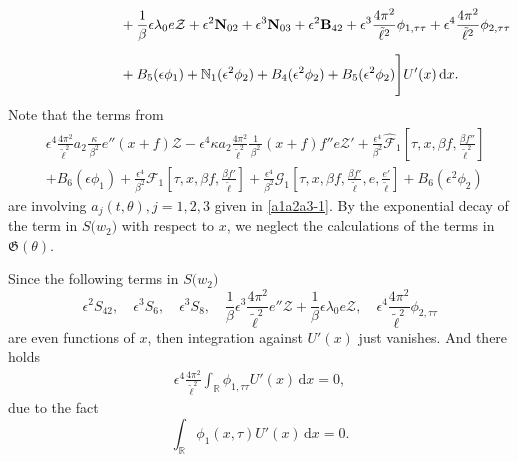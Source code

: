 \documentclass[10pt, reqno]{amsart}
\numberwithin{equation}{section}
\theoremstyle{definition}
\begin{document}
{\begin{align*}
&\qquad \qquad \qquad \qquad
 +\frac 1\beta \epsilon\lambda_0 e{\mathcal Z}
 +\epsilon^2 {\bf N}_{02}
 +\epsilon^3 {\bf N}_{03}
 + \epsilon^2 {\bf B}_{42}
 + \epsilon^3 \frac{4\pi^2}{{\tilde\ell}^2} {\phi}_{1, \tau\tau}
 + \epsilon^4 \frac{4\pi^2}{{\tilde\ell}^2}\phi_{2, \tau\tau}
\nonumber\\[2mm]
&\qquad \qquad \qquad \qquad
+B_{5}(\epsilon\phi_1) + \mathbb{N}_1 (\epsilon^2 \phi_2)
+ B_4(\epsilon^2\phi_2)+ B_5 (\epsilon^2{\phi_2}) \Bigg] U'(x) \,{\mathrm d}x.
\end{align*}
Note that the terms from
\begin{align*}
 & \epsilon^4 \frac{4\pi^2} {{\tilde\ell}^2} a_2\frac{\kappa}{\, \beta^2\, } e'' (x+f)\mathcal Z -\epsilon^4 \kappa a_2 \frac{ 4\pi^2} {{\tilde\ell}^2} \frac{1}{\, \beta^2\, } (x+f) f'' e \mathcal Z' + \frac{\epsilon^4}{\beta^2} \hat{\mathcal F}_1\left[\tau, x, \beta f, \frac{\beta f''}{\tilde\ell^2} \right]
\nonumber\\[2mm]
&
+B_{6}(\epsilon\phi_1)
 + \frac{\epsilon^4}{\beta^2} \mathcal F_1\left[\tau, x, \beta f, \frac{\beta f'}{\tilde\ell}\right]
 +\frac{\epsilon^4} {\beta^2} \mathcal G_1\left[\tau, x, \beta f, \frac{\beta f'}{\tilde\ell}, e, \frac{e'}{\tilde\ell}\right]
 + B_6 (\epsilon^2{\phi_2})
\end{align*}
 are involving $a_j(t, \theta), j =1,2,3$ given in \eqref{a1a2a3-1}.
By the exponential decay of the term in $S\big(w_2\big)$ with respect to $x$,
 we neglect the calculations of the terms in $ \mathfrak G(\theta)$.


Since the following terms in $S\big(w_2\big)$
$$
\epsilon^2 S_{42},\quad \epsilon^3 S_6,\quad \epsilon^3 S_8,\quad
\frac 1\beta\epsilon^3\frac{4\pi^2}{{\tilde\ell}^2} e''\mathcal Z +\frac 1\beta \epsilon\lambda_0 e{\mathcal Z},
\quad \epsilon^4 \frac{4\pi^2}{{\tilde\ell}^2}\phi_{2, \tau\tau}
$$
are even functions of $x$, then integration against $U'(x)$ just vanishes.
 And there holds
\begin{align*}
 \epsilon^4 \frac{4\pi^2}{{\tilde\ell}^2}\int_{\mathbb R}\phi_{1, \tau\tau} U'(x) \,{\mathrm d}x=0,
\end{align*}
 due to the fact
$$
\int_{\mathbb R}\phi_{1}(x,\tau) U'(x)\,{\mathrm d}x=0.
$$

}
\end{document}
